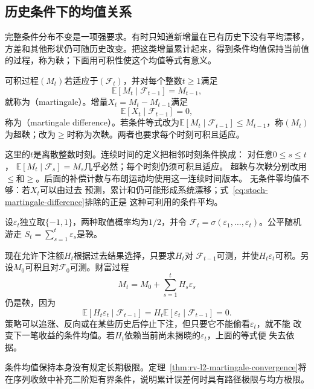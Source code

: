 \subsection{历史条件下的均值关系}

完整条件分布不变是一项强要求。有时只知道新增量在已有历史下没有平均漂移，方差和其他形状仍可随历史改变。把这类增量累计起来，得到条件均值保持当前值的过程，称为鞅；下面用可积性使这个均值等式有意义。
\label{sec:rv-martingales}
\begin{definition}[鞅与鞅差]
  \label{def:stoch-martingale}
可积过程$(M_t)$若适应于$(\mathcal{F}_t)$，并对每个整数$t\geq1$满足
\begin{equation}
  \mathbb{E}[M_t\mid\mathcal{F}_{t-1}]=M_{t-1},
  \label{eq:stoch-martingale-definition}
\end{equation}
就称为（martingale）。增量$X_t=M_t-M_{t-1}$满足
\begin{equation}
  \mathbb{E}[X_t\mid\mathcal{F}_{t-1}]=0,
  \label{eq:stoch-martingale-difference}
\end{equation}
称为（martingale difference）。若条件等式改为\(\mathbb E[M_t\mid\mathcal F_{t-1}]\leq M_{t-1}\)，称\((M_t)\)为超鞅；改为\(\geq\)时称为次鞅。两者也要求每个时刻可积且适应。
\end{definition}
这里的\(t\)是离散整数时刻。连续时间的定义把相邻时刻条件换成：
对任意\(0\leq s\leq t\)，
\(\mathbb E[M_t\mid\mathcal F_s]=M_s\)几乎必然；每个时刻仍须可积且适应。
超鞅与次鞅分别改用\(\leq\)和\(\geq\)。后面的补偿计数与布朗运动均使用这一连续时间版本。
无条件零均值不够：若$X_t$可以由过去
预测，累计和仍可能形成系统漂移；式~\eqref{eq:stoch-martingale-difference}排除的正是
这种可利用的条件平均。

\begin{example}[公平随机游走与按过去下注]
  \label{ex:stoch-predictable-betting}
  设$\varepsilon_t$独立取$\{-1,1\}$，两种取值概率均为$1/2$，并令
  $\mathcal{F}_t=\sigma(\varepsilon_1,\ldots,\varepsilon_t)$。公平随机游走
  $S_t=\sum_{s=1}^{t}\varepsilon_s$是鞅。

  现在允许下注额$H_t$根据过去结果选择，只要求$H_t$对
  $\mathcal{F}_{t-1}$可测，并使$H_t\varepsilon_t$可积。另设\(M_0\)可积且对\(\mathcal F_0\)可测。财富过程
  \[
    M_t=M_0+\sum_{s=1}^{t}H_s\varepsilon_s
  \]
  仍是鞅，因为
  \[
    \mathbb{E}[H_t\varepsilon_t\mid\mathcal{F}_{t-1}]
    =
    H_t\mathbb{E}[\varepsilon_t\mid\mathcal{F}_{t-1}]
    =0.
  \]
  策略可以追涨、反向或在某些历史后停止下注，但只要它不能偷看$\varepsilon_t$，就不能
  改变下一笔收益的条件均值。若$H_t$依赖当前尚未揭晓的$\varepsilon_t$，上面的等式便
  失去依据。
\end{example}
条件均值保持本身没有规定长期极限。定理~\ref{thm:rv-l2-martingale-convergence}将在序列收敛中补充二阶矩有界条件，说明累计误差何时具有路径极限与均方极限。

